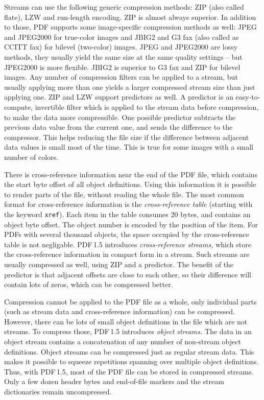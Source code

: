 \documentclass{ltugproc}
\begin{document}
Streams can use the following generic compression methods: ZIP (also called
flate), LZW and run-length encoding. ZIP is almost always superior. In
addition to those, PDF supports some image-specific compression methods as
well: JPEG and JPEG2000 for true-color images and JBIG2 and G3 fax (also
called as CCITT fax) for bilevel (two-color) images. JPEG and JPEG2000 are
lossy methods, they usually yield the same size at the same quality
settings -- but JPEG2000 is more flexible. JBIG2 is superior to G3 fax and
ZIP for bilevel images. Any number of compression filters can be applied to
a stream, but usually applying more than one yields a larger compressed
stream size than just applying one. ZIP and LZW support predictors as well. A
predictor is an easy-to-compute, invertible filter which is applied to the
stream data before compression, to make the data more compressible. One
possible predictor subtracts the previous data value from the current one,
and sends the difference to the compressor. This helps reducing the file
size if the difference between adjacent data values is small most of the
time. This is true for some images with a small number of colors.

There is cross-reference information near the end of the PDF file, which
contains the start byte offset of all object definitions. Using this
information it is possible to render parts of the file, without reading the
whole file. The most common format for cross-reference information is the
\emph{cross-reference table} (starting with the keyword \texttt{xref}). Each item
in the table consumes 20 bytes, and contains an object byte offset. The
object number is encoded by the position of the item. For PDFs with several
thousand objects, the space occupied by the cross-reference table is not
negligable. PDF\,1.5 introduces \emph{cross-reference streams,} which store
the cross-reference information in compact form in a stream. Such streams
are usually compressed as well, using ZIP and a predictor. The benefit of the
predictor is that adjacent offsets are close to each other, so their
difference will contain lots of zeros, which can be compressed better.

Compression cannot be applied to the PDF file as a whole, only individual
parts (such as stream data and cross-reference information) can be
compressed. However, there can be lots of small object definitions in the
file which are not streams. To compress those, PDF\,1.5 introduces
\emph{object streams.} The data in an object stream contains a concatenation
of any number of non-stream object definitions. Object streams can be
compressed just as regular stream data. This makes it possible to squeeze
repetitions spanning over multiple object definitions. Thus, with PDF\,1.5,
most of the PDF file can be stored in compressed streams. Only a few dozen
header bytes and end-of-file markers and the stream dictionaries remain
uncompressed.
\end{document}

